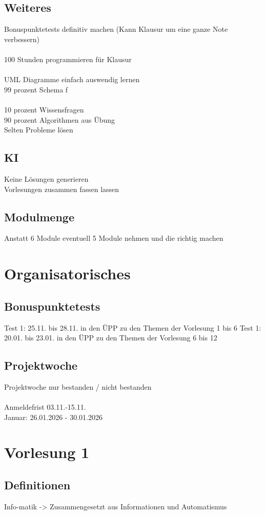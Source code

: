 \documentclass[11pt, a4paper]{article}
\begin{document}
\subsection{Weiteres}
Bonuspunktetests definitiv machen (Kann Klausur um eine ganze Note verbessern)\\
\\100 Stunden programmieren für Klausur\\
\\UML Diagramme einfach auswendig lernen\\99 prozent Schema f\\
\\10 prozent Wissensfragen\\90 prozent Algorithmen aus Übung\\Selten Probleme lösen

\subsection{KI}
Keine Lösungen generieren\\Vorlesungen zusammen fassen lassen

\subsection{Modulmenge}
Anstatt 6 Module eventuell 5 Module nehmen und die richtig machen

\section{Organisatorisches}
\subsection{Bonuspunktetests}
Test 1: 25.11. bis 28.11. in den ÜPP zu den Themen der Vorlesung 1 bis 6
Test 1: 20.01. bis 23.01. in den ÜPP zu den Themen der Vorlesung 6 bis 12
\subsection{Projektwoche}
Projektwoche nur bestanden / nicht bestanden\\\\Anmeldefrist 03.11.-15.11.\\Januar: 26.01.2026 - 30.01.2026
\section{Vorlesung 1}
\subsection{Definitionen}
Info-matik -> Zusammengesetzt aus Informationen und Automatismus\\
\end{document}
